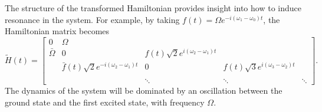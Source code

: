 \documentclass[11pt]{article}
\begin{document}
The structure of the transformed Hamiltonian provides insight into how to induce resonance in the
system. For example, by taking $f(t)=\Omega e^{-i(\omega_1 - \omega_0)t}$, the Hamiltonian matrix
becomes
\[
\tilde{H}(t) = \begin{bmatrix}
0 & \Omega & & &\\
\bar{\Omega} & 0 & f(t) \sqrt{2} e^{i(\omega_2 -\omega_1) t}& &\\
& \bar{f}(t) \sqrt{2} e^{-i(\omega_2 -\omega_1) t} & 0 & f(t) \sqrt{3} e^{i(\omega_3 -\omega_2)t}
&\\
\\
& & \ddots & \ddots & \ddots
\end{bmatrix}.
\]
The dynamics of the system will be dominated by an oscillation between the ground state and the
first excited state, with frequency $\Omega$.
\end{document}
